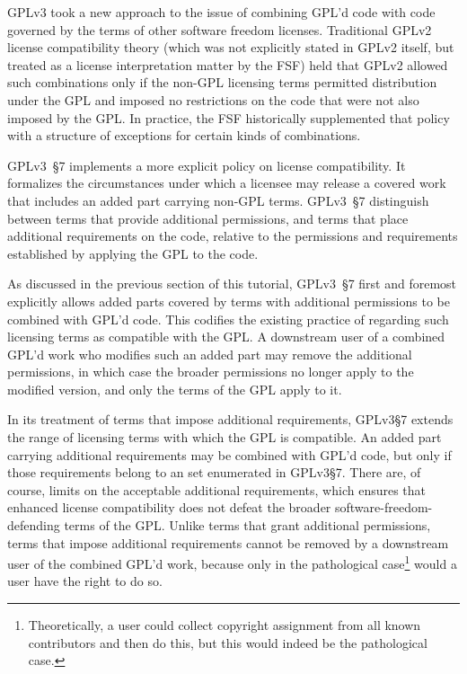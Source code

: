 GPLv3  took a new approach to the issue of combining GPL'd code with
code governed by the terms of other software freedom licenses.  Traditional
GPLv2 license compatibility theory (which was not explicitly stated in GPLv2
itself, but treated as a license interpretation matter by the FSF) held that GPLv2 allowed such
combinations only if the non-GPL licensing terms permitted distribution under
the GPL and imposed no restrictions on the code that were not also imposed by
the GPL\@.  In practice, the FSF historically supplemented that policy with a structure of
exceptions for certain kinds of combinations.

GPLv3~\S7  implements a more explicit policy on license
compatibility.  It formalizes the circumstances under which a licensee may
release a covered work that includes an added part carrying non-GPL terms. 
GPLv3~\S7 distinguish between terms that provide additional permissions, and terms that
place additional requirements on the code, relative to the permissions and
requirements established by applying the GPL to the code.

As discussed in the previous section of this tutorial, GPLv3~\S7 first and foremost explicitly allows added parts covered by terms with
additional permissions to be combined with GPL'd code. This codifies the
existing practice of regarding such licensing terms as compatible with the
GPL\@. A downstream user of a combined GPL'd work who modifies such an added
part may remove the additional permissions, in which case the broader
permissions no longer apply to the modified version, and only the terms of
the GPL apply to it.

In its treatment of terms that impose additional requirements, GPLv3\S7
extends the range of licensing terms with which the GPL is compatible.  An
added part carrying additional requirements may be combined with GPL'd code,
but only if those requirements belong to an set enumerated in GPLv3\S7. There
are, of course,  limits on the acceptable additional requirements, which 
ensures that enhanced license compatibility does not
defeat the broader software-freedom-defending terms of the GPL\@. Unlike terms that grant
additional permissions, terms that impose additional requirements cannot be
removed by a downstream user of the combined GPL'd work, because only in the
pathological case\footnote{Theoretically, a user could collect copyright
  assignment from all known contributors and then do this, but this would
  indeed be the pathological case.}  would a user have the right to do so.

